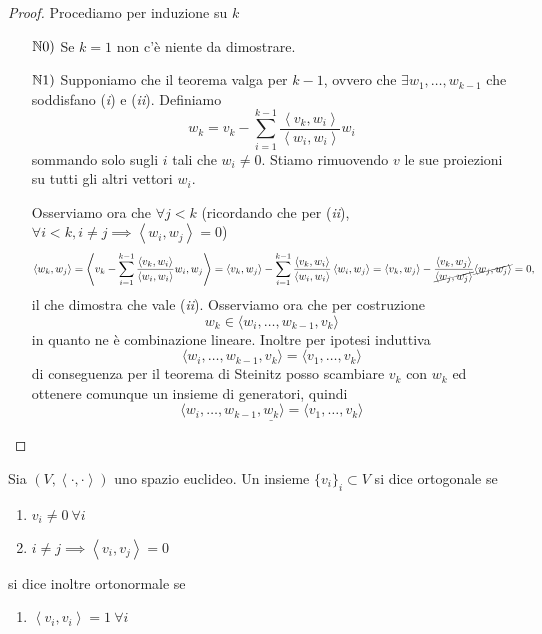 \documentclass{article}     %
\let\undl\underline
\newcommand{\scp}[1][\cdot,\cdot]{\left\langle #1 \right\rangle}
\begin{document}
\begin{proof}
    Procediamo per induzione su $k$
    \begin{enumerate}
        \item[$\mathbb{N}0)$] Se $k=1$ non c'è niente da dimostrare.
        \item[$\mathbb{N}1)$] Supponiamo che il teorema valga per $k-1$, ovvero che $\exists w_1, \dots, w_{k-1}$ che soddisfano (\textit{i}) e (\textit{ii}). Definiamo 
        \[w_k=v_k-\sum_{i=1}^{k-1}\frac{\scp[v_k,w_i]}{\scp[w_i,w_i]}w_i\]
        sommando solo sugli $i$ tali che $w_i\neq 0$. Stiamo rimuovendo $v$ le sue proiezioni su tutti gli altri vettori $w_i$.

        Osserviamo ora che $\forall j<k$ (ricordando che per (\textit{ii}), $\forall i < k, i\neq j\implies \scp[w_i,w_j]=0$)
        \[\scp[w_k,w_j]=\scp[v_k-\sum_{i=1}^{k-1}\frac{\scp[v_k,w_i]}{\scp[w_i,w_i]}w_i, w_j] = \scp[v_k,w_j]-\sum_{i=1}^{k-1}\frac{\scp[v_k,w_i]}{\scp[w_i,w_i]}\scp[w_i,w_j] = \scp[v_k,w_j]-\frac{\scp[v_k,w_j]}{\cancel{\scp[w_j,w_j]}}\cancel{\scp[w_j,w_j]}=0,\]
        il che dimostra che vale (\textit{ii}). Osserviamo ora che per costruzione 
        \[w_k\in \langle w_i, \dots, w_{k-1}, v_k \rangle\]
        in quanto ne è combinazione lineare. Inoltre per ipotesi induttiva
        \[\langle w_i, \dots, w_{k-1}, v_k \rangle=\langle v_1, \dots, v_k\rangle\]
        di conseguenza per il teorema di Steinitz posso scambiare $v_k$ con $w_k$ ed ottenere comunque un insieme di generatori, quindi 
        \[\langle w_i, \dots, w_{k-1},\undl{w_k} \rangle=\langle v_1, \dots, v_k\rangle\]
    \end{enumerate}
\end{proof}

\begin{boxdef}
    Sia $(V,\scp)$ uno spazio euclideo. Un insieme $\{v_i\}_i\subset V$ si dice ortogonale se 
    \begin{enumerate}[label=$\roman*)$]
        \item $v_i\neq 0\ \forall i$
        \item $i\neq j \implies \scp[v_i,v_j]=0$
    \end{enumerate}
    si dice inoltre ortonormale se 
    \begin{enumerate}[label=$\roman*)$, resume]
        \item $\scp[v_i,v_i]=1\ \forall i$
    \end{enumerate}
\end{boxdef}
\end{document}
